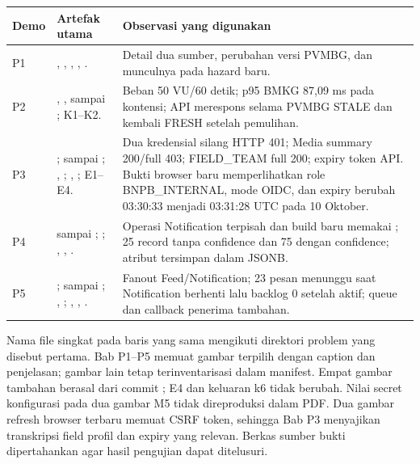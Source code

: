 \begin{longtable}{@{}P{1.3cm}P{5.9cm}P{7.6cm}@{}}
\toprule \textbf{Demo} & \textbf{Artefak utama} & \textbf{Observasi yang digunakan}\\\midrule\endhead
P1 & , , , , . & Detail dua sumber, perubahan versi PVMBG, dan munculnya  pada hazard baru.\\
P2 & , ,  sampai ; K1--K2. & Beban 50 VU/60 detik; p95 BMKG 87,09 ms pada kontensi; API merespons selama PVMBG STALE dan kembali FRESH setelah pemulihan.\\
P3 & ;  sampai ; , ; , ; E1--E4. & Dua kredensial silang HTTP 401; Media summary 200/full 403; FIELD\_TEAM full 200; expiry token API. Bukti browser baru memperlihatkan role BNPB\_INTERNAL, mode OIDC, dan expiry berubah 03:30:33 menjadi 03:31:28 UTC pada 10 Oktober.\\
P4 &  sampai ; ; , , . & Operasi Notification terpisah dan build baru memakai ; 25 record tanpa confidence dan 75 dengan confidence; atribut tersimpan dalam JSONB.\\
P5 & ;  sampai ; , ; , , . & Fanout Feed/Notification; 23 pesan menunggu saat Notification berhenti lalu backlog 0 setelah aktif; queue dan callback penerima tambahan.\\\bottomrule
\end{longtable}

Nama file singkat pada baris yang sama mengikuti direktori problem yang disebut pertama. Bab P1--P5 memuat gambar terpilih dengan caption dan penjelasan; gambar lain tetap terinventarisasi dalam manifest. Empat gambar tambahan berasal dari commit ; E4 dan keluaran k6 tidak berubah. Nilai secret konfigurasi pada dua gambar M5 tidak direproduksi dalam PDF. Dua gambar refresh browser terbaru memuat CSRF token, sehingga Bab P3 menyajikan transkripsi field profil dan expiry yang relevan. Berkas sumber bukti dipertahankan agar hasil pengujian dapat ditelusuri.

